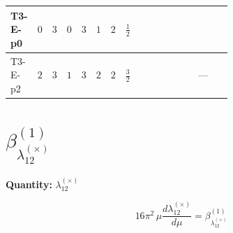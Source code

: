 \documentclass[8pt]{article}
\begin{document}
\begin{landscape}
\begin{longtable}{@{}llcccccc >{\raggedright\arraybackslash}p{0.21\linewidth} >{\raggedright\arraybackslash}p{0.21\linewidth} >{\raggedright\arraybackslash}p{0.21\linewidth}@{}}
T3-E-p0 & $0$ & $3$ & $0$ & $3$ & $1$ & $2$ & $\frac{1}{2}$ & \scriptsize\adjustbox{max width=\linewidth}{$\begin{gathered} +16 {\lambda_{12}^{(A)}} {\lambda_{S_2}^{(A)}}\end{gathered}$} & \scriptsize\adjustbox{max width=\linewidth}{$\begin{gathered} +3 {\lambda_{HS_1}^{(A)}} {\lambda_{HS_2}^{(A)}}\end{gathered}$} & \scriptsize\adjustbox{max width=\linewidth}{$\begin{gathered} -6 {g_1}^2 {\lambda_{12}^{(A)}}\end{gathered}$} \\
\midrule
T3-E-p2 & $2$ & $3$ & $1$ & $3$ & $2$ & $2$ & $\frac{3}{2}$ & \scriptsize\adjustbox{max width=\linewidth}{$\begin{gathered} +16 {\lambda_{12}^{(A)}} {\lambda_{S_2}^{(A)}}\end{gathered}$} & \scriptsize\adjustbox{max width=\linewidth}{$\begin{gathered} +3 {\lambda_{HS_1}^{(A)}} {\lambda_{HS_2}^{(A)}}\end{gathered}$} & --- \\
\midrule
\bottomrule
\end{longtable}
\clearpage
\section*{$\beta_{\lambda_{12}^{(\times)}}^{(1)}$}
\noindent\textbf{Quantity: }$\lambda_{12}^{(\times)}$\par\smallskip
\[16\pi^2\,\mu\frac{d \lambda_{12}^{(\times)}}{d\mu}=\beta_{\lambda_{12}^{(\times)}}^{(1)}\]

\end{landscape}
\end{document}
